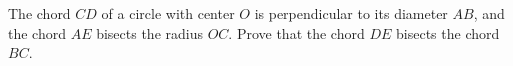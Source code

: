The chord $CD$ of a circle with center $O$ is perpendicular to its diameter $AB$, and the chord $AE$ bisects the radius $OC$. Prove that the chord $DE$ bisects the chord $BC$.
